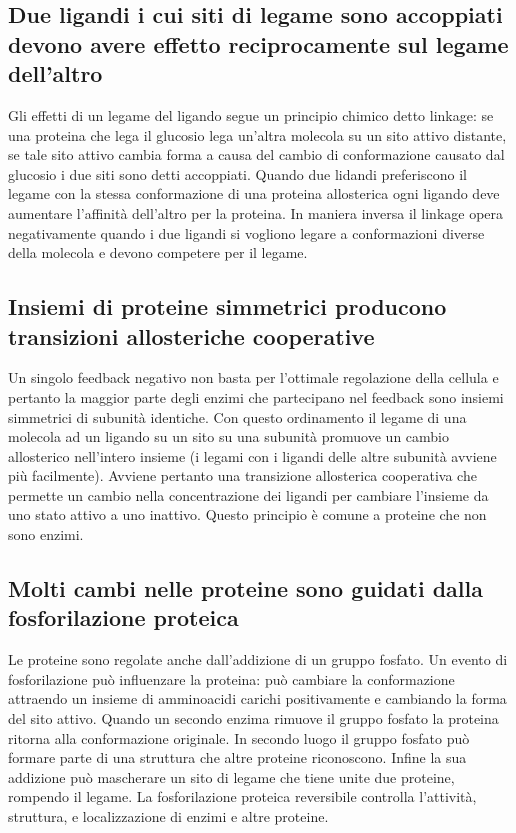 \subsection{Due ligandi i cui siti di legame sono accoppiati devono avere effetto reciprocamente sul legame dell'altro}
Gli effetti di un legame del ligando segue un principio chimico detto linkage: se una proteina che lega il glucosio lega un'altra molecola su un sito attivo distante, se tale sito
attivo cambia forma a causa del cambio di conformazione causato dal glucosio i due siti sono detti accoppiati. Quando due lidandi preferiscono il legame con la stessa conformazione di
una proteina allosterica ogni ligando deve aumentare l'affinit\`a dell'altro per la proteina. In maniera inversa il linkage opera negativamente quando i due ligandi si vogliono legare
a conformazioni diverse della molecola e devono competere per il legame. 
\subsection{Insiemi di proteine simmetrici producono transizioni allosteriche cooperative}
Un singolo feedback negativo non basta per l'ottimale regolazione della cellula e pertanto la maggior parte degli enzimi che partecipano nel feedback sono insiemi simmetrici di 
subunit\`a identiche. Con questo ordinamento il legame di una molecola ad un ligando su un sito su una subunit\`a promuove un cambio allosterico nell'intero insieme (i legami con i 
ligandi delle altre subunit\`a avviene pi\`u facilmente). Avviene pertanto una transizione allosterica cooperativa che permette un cambio nella concentrazione dei ligandi per cambiare 
l'insieme da uno stato attivo a uno inattivo. Questo principio \`e comune a proteine che non sono enzimi. 
\subsection{Molti cambi nelle proteine sono guidati dalla fosforilazione proteica}
Le proteine sono regolate anche dall'addizione di un gruppo fosfato. Un evento di fosforilazione pu\`o influenzare la proteina: pu\`o cambiare la conformazione attraendo un insieme
di amminoacidi carichi positivamente e cambiando la forma del sito attivo. Quando un secondo enzima rimuove il gruppo fosfato la proteina ritorna alla conformazione originale. In 
secondo luogo il gruppo fosfato pu\`o formare parte di una struttura che altre proteine riconoscono. Infine la sua addizione pu\`o mascherare un sito di legame che tiene unite 
due proteine, rompendo il legame. La fosforilazione proteica reversibile controlla l'attivit\`a, struttura, e localizzazione di enzimi e altre proteine. 
